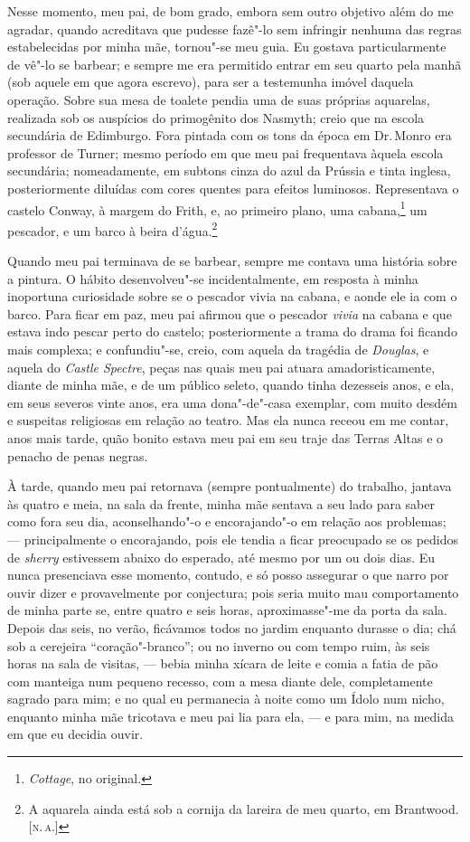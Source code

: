 Nesse momento, meu pai, de bom grado, embora sem outro objetivo além
do me agradar, quando acreditava que pudesse fazê"-lo sem infringir
nenhuma das regras estabelecidas por minha mãe, tornou"-se meu guia. Eu
gostava particularmente de vê"-lo se barbear; e sempre me era permitido
entrar em seu quarto pela manhã (sob aquele em que agora escrevo), para
ser a testemunha imóvel daquela operação. Sobre sua mesa de toalete
pendia uma de suas próprias aquarelas, realizada sob os auspícios do
primogênito dos Nasmyth; creio que na escola secundária de Edimburgo.
Fora pintada com os tons da época em Dr.\,Monro era professor de Turner;
mesmo período em que meu pai frequentava àquela escola secundária;
nomeadamente, em subtons cinza do azul da Prússia e tinta inglesa,
posteriormente diluídas com cores quentes para efeitos luminosos.
Representava o castelo Conway, à margem do Frith, e, ao primeiro plano,
uma cabana,\footnote{\textit{Cottage}, no original.} um
pescador, e um barco à beira d'água.\footnote{A aquarela ainda está sob a
  cornija da lareira de meu quarto, em Brantwood. {[}\textsc{n.\,a.}{]}}

Quando meu pai terminava de se barbear, sempre me contava uma
história sobre a pintura. O hábito desenvolveu"-se incidentalmente, em
resposta à minha inoportuna curiosidade sobre se o pescador vivia na
cabana, e aonde ele ia com o barco. Para ficar em paz, meu pai afirmou
que o pescador \textit{vivia} na cabana e que estava indo pescar perto do
castelo; posteriormente a trama do drama foi ficando mais complexa; e
confundiu"-se, creio, com aquela da tragédia de \textit{Douglas}, e aquela
do \textit{Castle Spectre}, peças nas quais meu pai atuara
amadoristicamente, diante de minha mãe, e de um público seleto, quando
tinha dezesseis anos, e ela, em seus severos vinte anos, era uma
dona"-de"-casa exemplar, com muito desdém e suspeitas religiosas em
relação ao teatro. Mas ela nunca receou em me contar, anos mais tarde,
quão bonito estava meu pai em seu traje das Terras Altas e o penacho de
penas negras.

À tarde, quando meu pai retornava (sempre pontualmente) do trabalho,
jantava às quatro e meia, na sala da frente, minha mãe sentava a seu
lado para saber como fora seu dia, aconselhando"-o e encorajando"-o em
relação aos problemas; --- principalmente o encorajando, pois ele tendia
a ficar preocupado se os pedidos de \textit{sherry} estivessem abaixo do
esperado, até mesmo por um ou dois dias. Eu nunca presenciava esse
momento, contudo, e só posso assegurar o que narro por ouvir dizer e
provavelmente por conjectura; pois seria muito mau comportamento de
minha parte se, entre quatro e seis horas, aproximasse"-me da porta da
sala. Depois das seis, no verão, ficávamos todos no jardim enquanto
durasse o dia; chá sob a cerejeira ``coração"-branco''; ou no inverno ou
com tempo ruim, às seis horas na sala de visitas, --- bebia minha xícara
de leite e comia a fatia de pão com manteiga num pequeno recesso, com a
mesa diante dele, completamente sagrado para mim; e no qual eu
permanecia à noite como um Ídolo num nicho, enquanto minha mãe tricotava
e meu pai lia para ela, --- e para mim, na medida em que eu decidia
ouvir.

